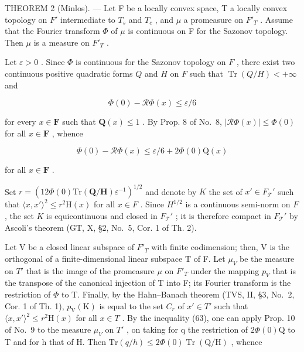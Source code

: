 THEOREM 2 (Minlos). --- Let F be a locally convex space, T a locally convex topology on \(F'\) intermediate to \(T_{s}\) and \(T_{c}\) , and \(\mu\) a promeasure on \(F'_{T}\) . Assume that the Fourier transform \(\Phi\) of \(\mu\) is continuous on F for the Sazonov topology. Then \(\mu\) is a measure on \(F'_{T}\) .

Let \(\varepsilon > 0\) . Since \(\Phi\) is continuous for the Sazonov topology on \(F\) , there exist two continuous positive quadratic forms \(Q\) and \(H\) on \(F\) such that \(\operatorname{Tr}(Q / H) < +\infty\) and

\[
\Phi (0) - \mathcal {R} \Phi (x) \leqslant \varepsilon / 6
\]

for every \(x \in \mathbf{F}\) such that \(\mathbf{Q}(x) \leqslant 1\) . By Prop. 8 of No.~8, \(|\mathcal{R}\Phi(x)| \leqslant \Phi(0)\) for all \(x \in \mathbf{F}\) , whence

\[
\Phi (0) - \mathcal {R} \Phi (x) \leqslant \varepsilon / 6 + 2 \Phi (0) \mathrm{Q} (x)\tag{63}
\]

for all \(x \in \mathbf{F}\) .

Set \(r = \left(12\Phi(0)\mathrm{Tr}(\mathbf{Q}/\mathbf{H})\varepsilon^{-1}\right)^{1/2}\) and denote by \(K\) the set of \(x' \in F_{\mathcal{T}}'\) such that \(\langle x, x' \rangle^2 \leqslant r^2\mathrm{H}(x)\) for all \(x \in F\) . Since \(H^{1/2}\) is a continuous semi-norm on \(F\) , the set \(K\) is equicontinuous and closed in \(F_{\mathcal{T}}'\) ; it is therefore compact in \(F_{\mathcal{T}}'\) by Ascoli's theorem (GT, X, §2, No.~5, Cor. 1 of Th. 2).

Let V be a closed linear subspace of \(F'_{T}\) with finite codimension; then, V is the orthogonal of a finite-dimensional linear subspace T of F. Let \(\mu_{V}\) be the measure on \(T'\) that is the image of the promeasure \(\mu\) on \(F'_{T}\) under the mapping \(p_{V}\) that is the transpose of the canonical injection of T into F; its Fourier transform is the restriction of \(\Phi\) to T. Finally, by the Hahn--Banach theorem (TVS, II, §3, No.~2, Cor. 1 of Th. 1), \(p_{\mathrm{V}}(\mathrm{K})\) is equal to the set \(C_{r}\) of \(x' \in T'\) such that \(\langle x, x' \rangle^{2} \leqslant r^{2}\mathrm{H}(x)\) for all \(x \in T\) . By the inequality (63), one can apply Prop. 10 of No.~9 to the measure \(\mu_{V}\) on \(T'\) , on taking for q the restriction of \(2\Phi(0)\mathrm{Q}\) to T and for h that of H. Then \(\mathrm{Tr}(q/h) \leqslant 2\Phi(0)\operatorname{Tr}(\mathrm{Q}/\mathrm{H})\) , whence

